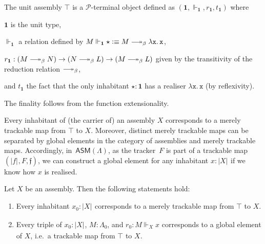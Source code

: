 \documentclass[a4paper,UKenglish,numberwithinsect,cleveref,thm-restate]{lipics-v2021}
\newcommand{\tproj}[3][]{\mathopen{}\left|#3\right|_{#2}^{#1}\mathclose{}}
\newcommand{\bproj}[1]{\tproj{}{#1}}
\newcommand{\PP}{\mathscr{P}}
\newcommand{\ASM}{\mathsf{ASM}}
\newcommand{\defeq}{\vcentcolon\equiv}
\newcommand{\Unit}{\mathbf{1}}
\DeclareRobustCommand\longtwoheadrightarrow{\relbar\joinrel\twoheadrightarrow}
\newcommand{\reduce}{\longtwoheadrightarrow_{\beta}}
\theoremstyle{plain}
\begin{document}
\begin{example}
  The unit assembly $\top$ is a $\PP$-terminal object defined as $(\Unit, \Vdash_{\Unit}, r_{\Unit}, t_{\Unit})$ where 
  \begin{romanenumerate}
    \item $\Unit$ is the unit type,  
    \item $\Vdash_{\Unit}$ a relation defined by $M \Vdash_{\Unit} \star \defeq M \reduce \mathtt{\lambda x.\, x}$, 
    \item $r_{\Unit}: (M \reduce N) \to (N \reduce L) \to (M \reduce L)$ given by the transitivity of the reduction relation $\reduce$,
    \item and $t_{\Unit}$ the fact that the only inhabitant $\star : \Unit$ has a realiser $\mathtt{\lambda x.\, x}$ (by reflexivity).
  \end{romanenumerate}
  The finality follows from the function extensionality.
\end{example}

Every inhabitant of (the carrier of) an assembly $X$ corresponds to a merely trackable map from $\top$ to $X$.
Moreover, distinct merely trackable maps can be separated by global elements in the category of assemblies and merely trackable maps. 
Accordingly, in~$\ASM(\Lambda)$, as the tracker~$F$ is part of a trackable map $(\bproj{f}, F, \mathfrak{f})$, we can construct a global element for any inhabitant $x : \bproj{X}$ if we know how $x$ is realised. 
\begin{lemma}\label{lem:global-elemnt}
  Let $X$ be an assembly. Then the following statements hold:
  \begin{enumerate}
    \item Every inhabitant $x_0 : \bproj{X}$ corresponds to a merely trackable map from $\top$ to $X$.
    \item Every triple of $x_0 : \bproj{X}$, $M : \Lambda_0$, and $r_0 : M \Vdash_X x$ corresponds to a global element of $X$, i.e.\ a trackable map from $\top$ to $X$.
  \end{enumerate}
\end{lemma}
\end{document}
